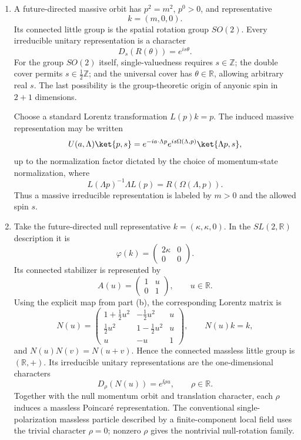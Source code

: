 \begin{enumerate}
\begin{enumerate}
\item[(d)] A future-directed massive orbit has \(p^2=m^2\), \(p^0>0\),
and representative
\[
 k=(m,0,0).
\]
Its connected little group is the spatial rotation group \(SO(2)\).
Every irreducible unitary representation is a character
\[
 D_s(R(\theta))=e^{is\theta}.
\]
For the group \(SO(2)\) itself, single-valuedness requires
\(s\in\mathbb Z\); the double cover permits
\(s\in\tfrac12\mathbb Z\); and the universal cover has
\(\theta\in\mathbb R\), allowing arbitrary real \(s\).  The last
possibility is the group-theoretic origin of anyonic spin in
\(2+1\) dimensions.

Choose a standard Lorentz transformation \(L(p)k=p\).  The induced
massive representation may be written
\[
 U(a,\Lambda)\ket{p,s}
 =e^{-ia\cdot\Lambda p}
  e^{is\Omega(\Lambda,p)}\ket{\Lambda p,s},
\]
up to the normalization factor dictated by the choice of momentum-state
normalization, where
\[
 L(\Lambda p)^{-1}\Lambda L(p)=R(\Omega(\Lambda,p)).
\]
Thus a massive irreducible representation is labeled by \(m>0\) and the
allowed spin \(s\).

\item[(e)] Take the future-directed null representative
\(k=(\kappa,\kappa,0)\).  In the \(SL(2,\mathbb R)\) description it is
\[
 \varphi(k)=\begin{pmatrix}2\kappa&0\\0&0\end{pmatrix}.
\]
Its connected stabilizer is represented by
\[
 A(u)=\begin{pmatrix}1&u\\0&1\end{pmatrix},
 \qquad u\in\mathbb R.
\]
Using the explicit map from part (b), the corresponding Lorentz matrix is
\[
 N(u)=
 \begin{pmatrix}
 1+\frac12u^2&-\frac12u^2&u\\
 \frac12u^2&1-\frac12u^2&u\\
 u&-u&1
 \end{pmatrix},
 \qquad N(u)k=k,
\]
and \(N(u)N(v)=N(u+v)\).  Hence the connected massless little group is
\((\mathbb R,+)\).  Its irreducible unitary representations are the
one-dimensional characters
\[
 D_\rho(N(u))=e^{\ii\rho u},
 \qquad \rho\in\mathbb R.
\]
Together with the null momentum orbit and translation character, each
\(\rho\) induces a massless Poincar\'e representation.  The conventional
single-polarization massless particle described by a finite-component
local field uses the trivial character \(\rho=0\); nonzero \(\rho\) gives
the nontrivial null-rotation family.
\end{enumerate}


\end{enumerate}
